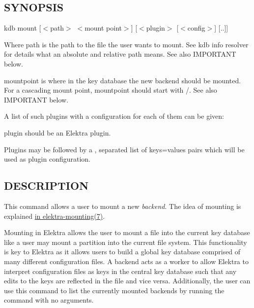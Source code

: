 \subsection*{S\+Y\+N\+O\+P\+S\+IS}

{\ttfamily kdb mount \mbox{[}$<$path$>$ $<$mount point$>$\mbox{]} \mbox{[}$<$plugin$>$ \mbox{[}$<$config$>$\mbox{]} \mbox{[}..\mbox{]}\mbox{]}}~\newline



\begin{DoxyItemize}
\item Where {\ttfamily path} is the path to the file the user wants to mount. See {\ttfamily kdb info resolver} for details what an absolute and relative path means. See also I\+M\+P\+O\+R\+T\+A\+NT below.
\item {\ttfamily mountpoint} is where in the key database the new backend should be mounted. For a cascading mount point, {\ttfamily mountpoint} should start with {\ttfamily /}. See also I\+M\+P\+O\+R\+T\+A\+NT below.
\item A list of such plugins with a configuration for each of them can be given\+:
\begin{DoxyItemize}
\item {\ttfamily plugin} should be an Elektra plugin.
\item Plugins may be followed by a {\ttfamily ,} separated list of {\ttfamily keys=values} pairs which will be used as plugin configuration.
\end{DoxyItemize}
\end{DoxyItemize}

\subsection*{D\+E\+S\+C\+R\+I\+P\+T\+I\+ON}

This command allows a user to mount a new {\itshape backend}. The idea of mounting is explained \hyperlink{doc_help_elektra-mounting_md}{in elektra-\/mounting(7)}.

Mounting in Elektra allows the user to mount a file into the current key database like a user may mount a partition into the current file system. This functionality is key to Elektra as it allows users to build a global key database comprised of many different configuration files. A backend acts as a worker to allow Elektra to interpret configuration files as keys in the central key database such that any edits to the keys are reflected in the file and vice versa. Additionally, the user can use this command to list the currently mounted backends by running the command with no arguments.

